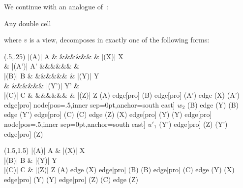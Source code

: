 \documentclass{LMCS}
\theoremstyle{plain}\newtheorem{satz}[thm]{Satz}
\begin{document}
We continue with an analogue of~:
\begin{prop}\label{prop:views:decomp}
  Any double cell
  \begin{center}
  \end{center}
where $v$ is a view, decomposes in exactly one of the following forms:
  \begin{center}
    \begin{minipage}[t]{0.35\linewidth}
      \centering \Diag (.5,.25) {     }{|(A)| A \& \&\&\&\&\&\& \& |(X)| X \\
        \& |(A')| A' \&\&\&\&\&\& \&  \\
        |(B)| B \& \&\&\&\&\&\& \& |(Y)| Y \\
        \& \&\&\&\&\&\& |(Y')| Y' \&  \\
        |(C)| C \& \&\&\&\&\&\& \& |(Z)| Z }{(A) edge[pro] (B) edge[pro] (A') edge (X) (A') edge[pro] node[pos=.5,inner sep=0pt,anchor=south east]
        {$\scriptstyle w_2$} (B) edge (Y) (B) edge (Y') edge[pro] (C) (C) edge (Z) (X) edge[pro] (Y) (Y) edge[pro] node[pos=.5,inner sep=0pt,anchor=south east]
        {$\scriptstyle u'_1$} (Y') edge[pro] (Z) (Y') edge[pro] (Z) } 
    \end{minipage}
    \hfil
    \begin{minipage}[t]{0.25\linewidth}
      \centering
      \Diag (1.5,1.5) {  }{|(A)| A \& |(X)| X \\
        |(B)| B \& |(Y)| Y \\
        |(C)| C \& |(Z)| Z }{(A) edge (X) edge[pro] (B) (B) edge[pro] (C) edge (Y) (X) edge[pro] (Y) (Y) edge[pro] (Z) (C) edge (Z) }
    \end{minipage}
    \hfil
    \begin{minipage}[t]{0.35\linewidth}

\end{minipage}
\end{center}
\end{prop}
\end{document}
